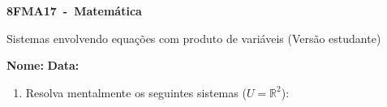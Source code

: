 \documentclass[a4paper,14pt]{article}
\begin{document}
	
	\noindent\textbf{8FMA17~-~Matemática} 
	
	\begin{center}Sistemas envolvendo equações com produto de variáveis (Versão estudante)
	\end{center}
	
	
	\noindent\textbf{Nome:} \underline{\hspace{10cm}}
	\noindent\textbf{Data:} \underline{\hspace{4cm}}
	
	\begin{multicols}{2}
		\begin{enumerate}
			\item Resolva mentalmente os seguintes sistemas ($U = \mathbb{R}^2$):
\end{enumerate}
\end{multicols}
\end{document}
